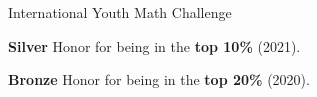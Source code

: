\entryItem
	{International Youth Math Challenge}
	{}

	\begin{items}
		\item \textbf{Silver} Honor for being in the \textbf{top 10\%} (2021).
		\item \textbf{Bronze} Honor for being in the \textbf{top 20\%} (2020).
	\end{items}
